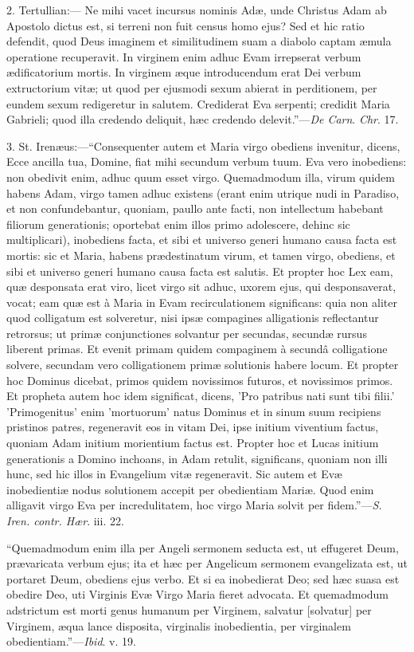 2. Tertullian:— Ne mihi vacet incursus nominis Adæ, unde Christus
Adam ab Apostolo dictus est, si terreni non fuit census homo ejus? Sed
et hic ratio defendit, quod Deus imaginem et similitudinem suam a
diabolo captam æmula operatione recuperavit. In virginem enim adhuc
Evam irrepserat verbum ædificatorium mortis. In virginem æque
introducendum erat Dei verbum extructorium vitæ; ut quod per ejusmodi
sexum abierat in perditionem, per eundem sexum redigeretur in salutem.
Crediderat Eva serpenti; credidit Maria Gabrieli; quod illa credendo
deliquit, hæc credendo delevit.''—\emph{De Carn}. \emph{Chr}. 17.


3. St. Irenæus:—``Consequenter autem et Maria virgo obediens
invenitur, dicens, Ecce ancilla tua, Domine, fiat mihi secundum verbum
tuum. Eva vero inobediens: non obedivit enim, adhuc quum esset virgo.
Quemadmodum illa, virum quidem habens Adam, virgo tamen adhuc existens (erant
enim utrique nudi in Paradiso, et non confundebantur, quoniam, paullo
ante facti, non intellectum habebant filiorum generationis; oportebat
enim illos primo adolescere, dehinc sic multiplicari), inobediens facta,
et sibi et universo generi humano causa facta est mortis: sic et Maria,
habens prædestinatum virum, et tamen virgo, obediens, et sibi et
universo generi humano causa facta est salutis. Et propter hoc Lex eam,
quæ desponsata erat viro, licet virgo sit adhuc, uxorem ejus, qui
desponsaverat, vocat; eam quæ est à Maria in Evam recirculationem
significans: quia non aliter quod colligatum est solveretur, nisi ipsæ
compagines alligationis reflectantur retrorsus; ut primæ conjunctiones
solvantur per secundas, secundæ rursus liberent primas. Et evenit
primam quidem compaginem à secundâ colligatione solvere, secundam
vero colligationem primæ solutionis habere locum. Et propter hoc
Dominus dicebat, primos quidem novissimos futuros, et novissimos primos.
Et propheta autem hoc idem significat, dicens, 'Pro patribus nati sunt
tibi filii.' 'Primogenitus' enim 'mortuorum' natus Dominus et in
sinum suum recipiens pristinos patres, regeneravit eos in vitam Dei,
ipse initium viventium factus, quoniam Adam initium morientium factus
est. Propter hoc et Lucas initium generationis a Domino inchoans, in
Adam retulit, significans, quoniam non illi hunc, sed hic illos in
Evangelium vitæ regeneravit. Sic autem et Evæ inobedientiæ nodus
solutionem accepit per obedientiam Mariæ. Quod enim alligavit virgo Eva
per incredulitatem, hoc virgo Maria solvit per fidem.''—\emph{S. Iren.
contr. Hær}. iii. 22.


``Quemadmodum enim illa per Angeli sermonem seducta est, ut
effugeret Deum, prævaricata verbum ejus; ita et hæc per Angelicum
sermonem evangelizata est, ut portaret Deum, obediens ejus verbo. Et si
ea inobedierat Deo; sed hæc suasa est obedire Deo, uti Virginis Evæ
Virgo Maria fieret advocata. Et quemadmodum adstrictum est morti genus
humanum per Virginem, salvatur [solvatur] per Virginem, æqua lance
disposita, virginalis inobedientia, per virginalem obedientiam.''—\emph{Ibid}.
v. 19.


